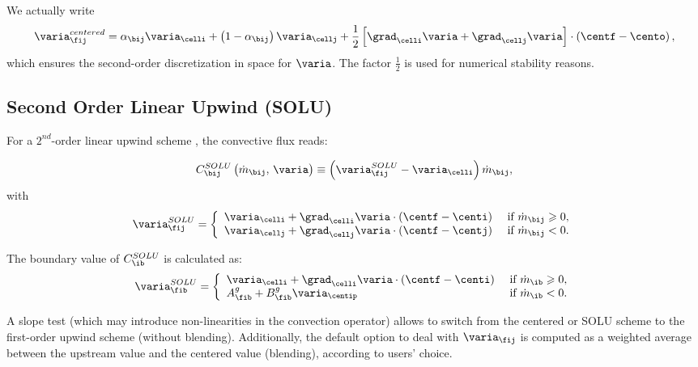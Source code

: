\begin{remark}

We actually write
%
\begin{equation}
\varia_\fij^{centered} = \alpha_{\bij} \varia_{\celli} + \left( 1 - \alpha_{\bij} \right) \varia_{\cellj}
+
\dfrac{1}{2} \left[ \grad_{\celli} \varia + \grad_{\cellj} \varia \right] \cdot \left(\centf - \cento\right),
\end{equation}
%
which ensures the second-order discretization in space for $\varia$.
The factor $ \frac{1}{2}$ is used for numerical stability reasons.
\end{remark}

\subsection{Second Order Linear Upwind (SOLU)}
For a $2^{nd}$-order linear upwind scheme%
, the convective flux reads:

\begin{equation}
C_{\bij}^{SOLU} \left( \dot{m}_{\bij} , \, \varia \right)  \equiv \left(\varia_{\fij}^{SOLU} - \varia_{\celli} \right) \dot{m}_{\bij} ,
\end{equation}
with
\begin{equation}
\varia_\fij^{SOLU} =
\left\lbrace\begin{array}{l l}
\varia_{\celli} +\grad_{\celli} \varia \cdot \left(\centf - \centi\right)  & \text{ if } \dot{m}_{\bij}  \geqslant 0,\\
\varia_{\cellj} +\grad_{\cellj} \varia \cdot \left(\centf - \centj\right)   & \text{ if } \dot{m}_{\bij} < 0 .
\end{array}\right.
\end{equation}


The boundary value of $C_\ib^{SOLU}$ is calculated as:
\begin{equation}
\varia_\fib^{SOLU} =
\left\lbrace\begin{array}{l l}
\varia_{\celli} +\grad_{\celli} \varia \cdot \left(\centf - \centi\right)  & \text{ if } \dot{m}_{\ib}  \geqslant 0,\\
A^g_{\fib}  + B^g_{\fib} \varia_{\centip}  & \text{ if } \dot{m}_{\ib} < 0.
\end{array}\right.
\end{equation}

\begin{remark}
A slope test (which may introduce non-linearities in the convection operator) allows to switch from
the centered or SOLU scheme to the first-order upwind scheme (without blending). Additionally, the default option to deal with $\varia_\fij$ is
computed as a weighted average between the upstream value and the centered value (blending), according to users' choice.
\end{remark}


